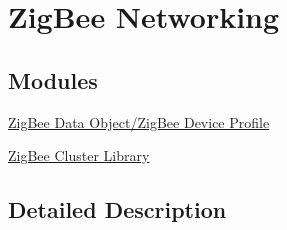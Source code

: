 \hypertarget{group__zigbee}{\section{Zig\-Bee Networking}
\label{group__zigbee}
}
\subsection*{Modules}
\begin{DoxyCompactItemize}
\item 
\hyperlink{group__zdo}{Zig\-Bee Data Object/\-Zig\-Bee Device Profile}
\item 
\hyperlink{group__zcl}{Zig\-Bee Cluster Library}
\end{DoxyCompactItemize}


\subsection{Detailed Description}
